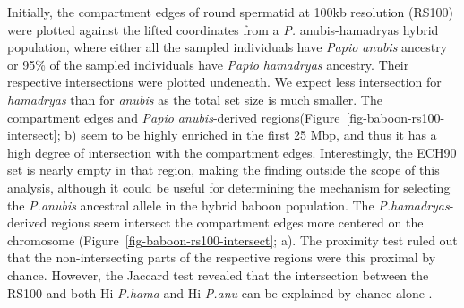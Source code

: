 \documentclass[
  11pt,
  a4paper,
]{scrbook}
\let\oldemph\emph
\renewcommand\emph[1]{\oldemph{\color{gray}#1}}
\begin{document}
Initially, the compartment edges of round spermatid at 100kb resolution
(RS100) were plotted against the lifted coordinates from a \emph{P.}
anubis-hamadryas hybrid population, where either all the sampled
individuals have \emph{Papio anubis} ancestry or 95\% of the sampled
individuals have \emph{Papio hamadryas} ancestry. Their respective
intersections were plotted undeneath. We expect less intersection for
\emph{hamadryas} than for \emph{anubis} as the total set size is much
smaller. The compartment edges and \emph{Papio anubis}-derived
regions(Figure~\ref{fig-baboon-rs100-intersect}; b) seem to be highly
enriched in the first 25 Mbp, and thus it has a high degree of
intersection with the compartment edges. Interestingly, the ECH90 set is
nearly empty in that region, making the finding outside the scope of
this analysis, although it could be useful for determining the mechanism
for selecting the \emph{P.anubis} ancestral allele in the hybrid baboon
population. The \emph{P.hamadryas}-derived regions seem intersect the
compartment edges more centered on the chromosome
(Figure~\ref{fig-baboon-rs100-intersect}; a). The proximity test ruled
out that the non-intersecting parts of the respective regions were this
proximal by chance. However, the Jaccard test revealed that the
intersection between the RS100 and both Hi-\emph{P.hama} and
Hi-\emph{P.anu} can be explained by chance alone .
\end{document}
